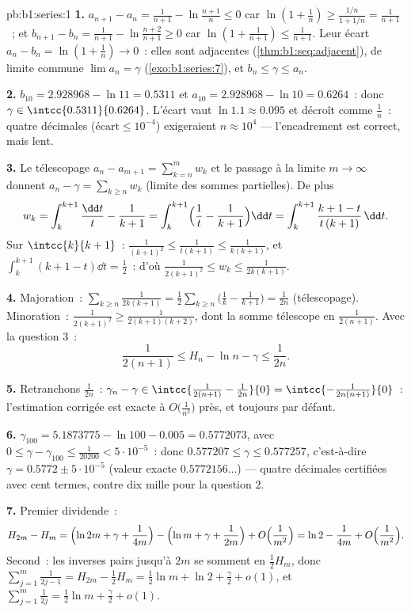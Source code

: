 \begin{solution}{pb:b1:series:1}
\textbf{1.} $a_{n+1} - a_n = \frac{1}{n+1} - \ln\frac{n+1}{n}
\leq 0$ car $\ln(1 + \frac1n) \geq \frac{1/n}{1 + 1/n} =
\frac{1}{n+1}$~; et $b_{n+1} - b_n = \frac{1}{n+1} -
\ln\frac{n+2}{n+1} \geq 0$ car $\ln(1 + \frac{1}{n+1}) \leq
\frac{1}{n+1}$. Leur écart $a_n - b_n = \ln(1 + \frac1n) \to 0$~:
elles sont adjacentes (\cref{thm:b1:seq:adjacent}), de limite commune
$\lim a_n = \gamma$ (\cref{exo:b1:series:7}), et $b_n \leq \gamma
\leq a_n$.

\textbf{2.} $b_{10} = 2.928968 - \ln 11 = 0.5311$ et $a_{10} =
2.928968 - \ln 10 = 0.6264$~: donc $\gamma \in
\intcc{0.5311}{0.6264}$. L'écart vaut $\ln 1.1 \approx 0.095$ et
décroît comme $\frac1n$~: quatre décimales ($\text{écart} \leq
10^{-4}$) exigeraient $n \approx 10^4$ --- l'encadrement est correct,
mais lent.

\textbf{3.} Le télescopage $a_n - a_{m+1} = \sum_{k=n}^{m} w_k$ et le
passage à la limite $m \to \infty$ donnent $a_n - \gamma =
\sum_{k\geq n} w_k$ (limite des sommes partielles). De plus
\[
w_k = \int_k^{k+1} \frac{\dd t}{t} - \frac{1}{k+1}
= \int_k^{k+1} \Bigl(\frac1t - \frac{1}{k+1}\Bigr)\dd t
= \int_k^{k+1} \frac{k + 1 - t}{t\,(k+1)}\,\dd t .
\]
Sur $\intcc{k}{k+1}$~: $\frac{1}{(k+1)^2} \leq \frac{1}{t(k+1)}
\leq \frac{1}{k(k+1)}$, et $\int_k^{k+1}(k + 1 - t)\dd t =
\frac12$~: d'où $\frac{1}{2(k+1)^2} \leq w_k \leq
\frac{1}{2k(k+1)}$.

\textbf{4.} Majoration~: $\sum_{k \geq n} \frac{1}{2k(k+1)} =
\frac12\sum_{k\geq n}\bigl(\frac1k - \frac{1}{k+1}\bigr) =
\frac{1}{2n}$ (télescopage). Minoration~: $\frac{1}{2(k+1)^2} \geq
\frac{1}{2(k+1)(k+2)}$, dont la somme télescope en
$\frac{1}{2(n+1)}$. Avec la question 3~:
\[
\frac{1}{2(n+1)} \leq H_n - \ln n - \gamma \leq \frac{1}{2n} .
\]

\textbf{5.} Retranchons $\frac{1}{2n}$~: $\gamma_n - \gamma \in
\intcc{\frac{1}{2(n+1)} - \frac{1}{2n}}{0} =
\intcc{-\frac{1}{2n(n+1)}}{0}$~: l'estimation corrigée est exacte à
$O\bigl(\frac{1}{n^2}\bigr)$ près, et toujours par défaut.

\textbf{6.} $\gamma_{100} = 5.1873775 - \ln 100 - 0.005 =
0.5772073$, avec $0 \leq \gamma - \gamma_{100} \leq
\frac{1}{20200} < 5\cdot10^{-5}$~: donc $0.577207 \leq \gamma
\leq 0.577257$, c'est-à-dire $\gamma = 0.5772 \pm 5\cdot10^{-5}$
(valeur exacte $0.5772156\dots$) --- quatre décimales certifiées avec
cent termes, contre dix mille pour la question 2.

\textbf{7.} Premier dividende~:
\[
H_{2m} - H_m = \Bigl(\ln 2m + \gamma + \frac{1}{4m}\Bigr)
- \Bigl(\ln m + \gamma + \frac{1}{2m}\Bigr) +
O\Bigl(\frac{1}{m^2}\Bigr)
= \ln 2 - \frac{1}{4m} + O\Bigl(\frac{1}{m^2}\Bigr).
\]
Second~: les inverses pairs jusqu'à $2m$ se somment en $\frac12 H_m$,
donc $\sum_{j=1}^{m}\frac{1}{2j-1} = H_{2m} - \frac12 H_m = \frac12
\ln m + \ln 2 + \frac\gamma2 + o(1)$, et $\sum_{j=1}^m
\frac{1}{2j} = \frac12\ln m + \frac\gamma2 + o(1)$.


\end{solution}
